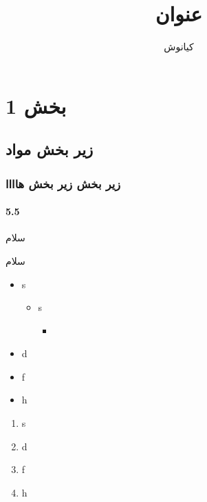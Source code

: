 \documentclass[a4paper,10pt]{article}
\title{عنوان}
\author{کیانوش}
\date{}
\begin{document}
    \maketitle
    \tableofcontents
    \newpage

    \section{بخش 1}

    \subsection{زیر بخش مواد}

    \subsubsection{زیر بخش زیر بخش هاااا}

    \paragraph{5.5}{سلام}

    سلام

    \begin{itemize}
        \item s
        \begin{itemize}
            \item s
            \begin{itemize}
                \item 
            \end{itemize}
        \end{itemize}
        \item d
        \item f
        \item h
    \end{itemize}

    \begin{enumerate}
        \item s
        \item d
        \item f
        \item h
    \end{enumerate}
\end{document}
